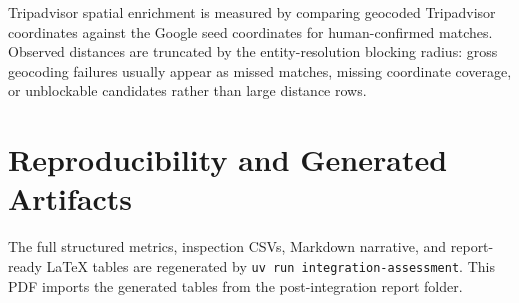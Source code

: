 Tripadvisor spatial enrichment is measured by comparing geocoded Tripadvisor
coordinates against the Google seed coordinates for human-confirmed matches.
Observed distances are truncated by the entity-resolution blocking radius:
gross geocoding failures usually appear as missed matches, missing coordinate
coverage, or unblockable candidates rather than large distance rows.


\section{Reproducibility and Generated Artifacts}

The full structured metrics, inspection CSVs, Markdown narrative, and
report-ready LaTeX tables are regenerated by
\texttt{uv run integration-assessment}. This PDF imports the generated tables
from the post-integration report folder.
